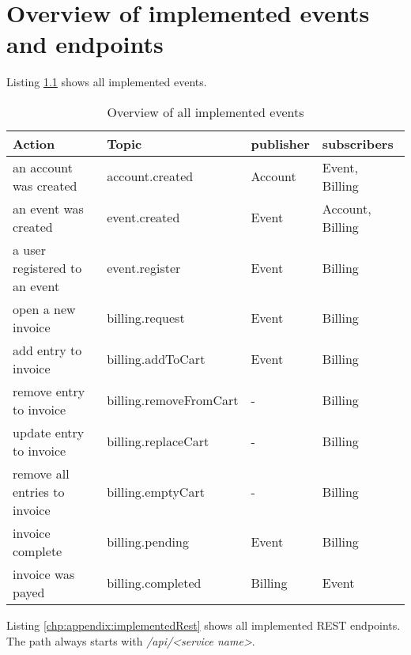 \chapter{Overview of implemented events and endpoints}

Listing \ref{chp:appendix:implementedEvent} shows all implemented events.

\begin{table}
    \centering
    \begin{tabular}{ |l|l|l|l| }
        \hline
        Action                        & Topic                  & publisher & subscribers      \\
        \hline
        an account was created        & account.created        & Account   & Event, Billing   \\
        \hline
        an event was created          & event.created          & Event     & Account, Billing \\
        a user registered to an event & event.register         & Event     & Billing          \\
        \hline
        open a new invoice            & billing.request        & Event     & Billing          \\
        add entry to invoice          & billing.addToCart      & Event     & Billing          \\
        remove entry to invoice       & billing.removeFromCart & -         & Billing          \\
        update entry to invoice       & billing.replaceCart    & -         & Billing          \\
        remove all entries to invoice & billing.emptyCart      & -         & Billing          \\
        invoice complete              & billing.pending        & Event     & Billing          \\
        invoice was payed             & billing.completed      & Billing   & Event            \\
        \hline
    \end{tabular}
    \caption{Overview of all implemented events} \label{chp:appendix:implementedEvent}
\end{table}

Listing \ref{chp:appendix:implementedRest} shows all implemented REST endpoints.
The path always starts with \textit{/api/<service name>}.

